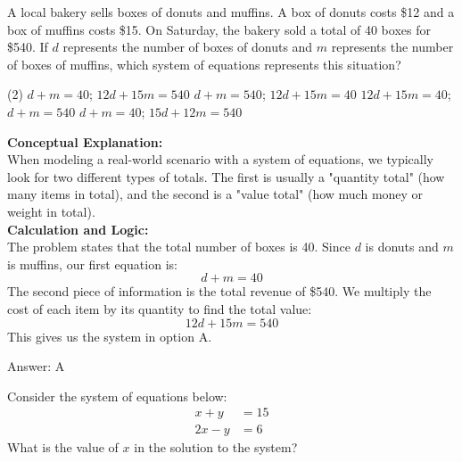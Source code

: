 \documentclass[11pt,paper=a4,answers]{exam}
\begin{document}
\begin{questions}
\pointsinrightmargin
\pointsdroppedatright
\marksnotpoints
{}
\pointformat{\boldmath\themarginpoints}
\bracketedpoints

\question
A local bakery sells boxes of donuts and muffins. A box of donuts costs \$12 and a box of muffins costs \$15. On Saturday, the bakery sold a total of 40 boxes for \$540. If $d$ represents the number of boxes of donuts and $m$ represents the number of boxes of muffins, which system of equations represents this situation?
\begin{tasks}(2)
    \task $d + m = 40$; $12d + 15m = 540$
    \task $d + m = 540$; $12d + 15m = 40$
    \task $12d + 15m = 40$; $d + m = 540$
    \task $d + m = 40$; $15d + 12m = 540$
\end{tasks}

\begin{solution}
\textbf{Conceptual Explanation:} \\
When modeling a real-world scenario with a system of equations, we typically look for two different types of totals. The first is usually a "quantity total" (how many items in total), and the second is a "value total" (how much money or weight in total).
\\[10pt]
\textbf{Calculation and Logic:} \\
The problem states that the total number of boxes is 40. Since $d$ is donuts and $m$ is muffins, our first equation is:
\[d + m = 40\]
The second piece of information is the total revenue of \$540. We multiply the cost of each item by its quantity to find the total value:
\[12d + 15m = 540\]
This gives us the system in option A.

\vspace{15pt}
Answer: \colorbox{yellow!100}{A}
\end{solution}



\question
Consider the system of equations below:
\begin{align*}
x + y &= 15 \\
2x - y &= 6
\end{align*}
What is the value of $x$ in the solution to the system?


\end{questions}
\end{document}
